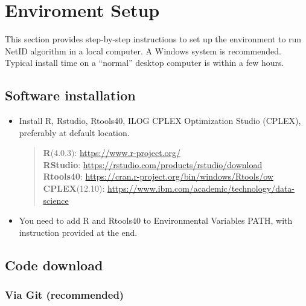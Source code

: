 \documentclass[]{article}
\author{Ziyang Chen}
\date{22 四月 2021}
\begin{document}
\maketitle


{
\setcounter{tocdepth}{2}
\tableofcontents
\newpage
}
\hypertarget{enviroment-setup}{%
\section{Enviroment Setup}\label{enviroment-setup}}

This section provides step-by-step instructions to set up the environment to run NetID algorithm in a local computer. A Windows system is recommended. Typical install time on a ``normal'' desktop computer is within a few hours.

\hypertarget{software-installation}{%
\subsection{Software installation}\label{software-installation}}

\begin{itemize}
\item
  Install R, Rstudio, Rtools40, ILOG CPLEX Optimization Studio (CPLEX), preferably at default location.

  \begin{quote}
  \textbf{R}(4.0.3): \url{https://www.r-project.org/}\\
  \textbf{RStudio}: \url{https://rstudio.com/products/rstudio/download}\\
  \textbf{Rtools40}: \url{https://cran.r-project.org/bin/windows/Rtools/ow}\\
  \textbf{CPLEX}(12.10): \url{https://www.ibm.com/academic/technology/data-science}
  \end{quote}
\item
  You need to add R and Rtools40 to Environmental Variables PATH, with instruction provided at the end.
\end{itemize}

\hypertarget{code-download}{%
\subsection{Code download}\label{code-download}}

\hypertarget{via-git-recommended}{%
\subsubsection{Via Git (recommended)}\label{via-git-recommended}}
\end{document}
